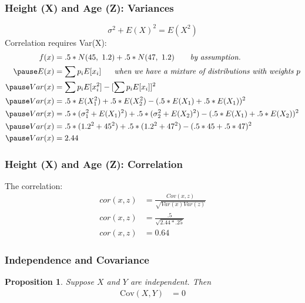 \documentclass[aspectratio=169, handout]{beamer}
\newtheorem{prop}{Proposition}
\numberwithin{equation}{section}
\begin{document}
\begin{frame}
\frametitle{Height (X) and Age (Z): Variances}
$$\sigma^2+E(X)^2=E(X^2)$$
Correlation requires Var(X):
\begin{align*}
f(x)&=.5*N(45,\ 1.2)+.5*N(47,\ 1.2)\ \ \quad \textit{ by assumption.}\\\pause
E(x)&=\sum p_i E[x_i] \ \quad \textit{ when we have a mixture of distributions with weights $p$}\\\pause
Var(x)&=\sum p_i E[x_i^2]-[\sum p_i E[x_i]]^2\\\pause
Var(x)&=.5*E(X_1^2)+.5*E(X_2^2)-(.5*E(X_1)+.5*E(X_1))^2\\\pause
Var(x)&=.5*(\sigma_1^2+E(X_1)^2)+.5*(\sigma_2^2+E(X_2)^2)-(.5*E(X_1)+.5*E(X_2))^2\\\pause
Var(x)&=.5*(1.2^2+45^2)+.5*(1.2^2+47^2)-(.5*45+.5*47)^2\\\pause
Var(x)&=2.44
\end{align*}
\end{frame}

\begin{frame}
\frametitle{Height (X) and Age (Z): Correlation}
The correlation:
\begin{align*}
cor(x,z)&=\frac{Cov(x,z)}{\sqrt{Var(x)Var(z)}}\\
cor(x,z)&=\frac{.5}{\sqrt{2.44*.25}}\\
cor(x,z)&=0.64
\end{align*}
\end{frame}


\begin{frame}
\frametitle{Independence and Covariance}

\begin{prop}
Suppose $X$ and $Y$ are independent.  Then 
\begin{align*}
\text{Cov}(X, Y) &= 0  
\end{align*}

\end{prop}

\end{frame}
\end{document}
